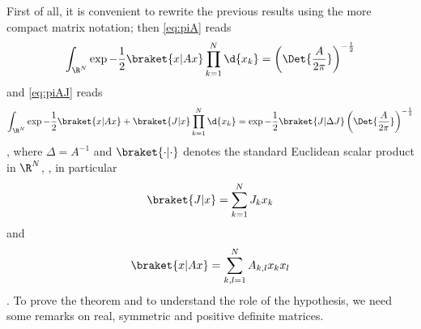 First of all,  it is convenient to rewrite the previous results using the more
compact matrix notation;
then \cref{eq:piA} reads
\begin{dmath}[label={piAmat}]
   \int_{\R^{N}} \exp{-\frac{1}{2} \braket{ x | Ax}  } \prod_{k=1}^{N}
   \d{x_{k}} = \left( \Det{ \frac{A}{2\pi}} \right)^{-\frac{1}{2}} 
\end{dmath}
and \cref{eq:piAJ} reads
\begin{dmath}[label={piAJmat}]
   \int_{\R^{N}} \exp{-\frac{1}{2} \braket{ x | Ax}  + \braket{J|x} } \prod_{k=1}^{N}
   \d{x_{k}} = \exp{-\frac{1}{2} \braket{J| \Delta J}} \left( \Det{ \frac{A}{2\pi}} \right)^{-\frac{1}{2}} 
\end{dmath},
where $\Delta = A^{-1}$ and $\braket{\cdot|\cdot}$ denotes the standard
Euclidean scalar product in $\R^{N}$, \ie, in particular
\begin{dmath*}
   \braket{J|x} = \sum_{k=1}^{N} J_{k} x_{k}
\end{dmath*}
and 
\begin{dmath*}
   \braket{x|Ax} = \sum_{k,l=1}^{N} A_{k,l} x_{k} x_{l}
\end{dmath*}.
To prove the theorem and to understand the role of the hypothesis, we need some remarks on real, symmetric and positive
definite matrices.

